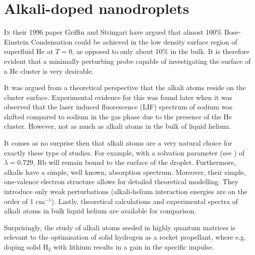 \chapter{Alkali-doped nanodroplets}

	\lettrine[lines=4]{\color{activeColor}I}{n} their 1996 paper\citep{Griffin1996} Griffin and Stringari have argued that almost 100\% Bose-Einstein Condensation could be achieved in the low density surface region of superfluid He at $T=0$, as opposed to only about 10\% in the bulk. It is therefore evident that a minimally perturbing probe capable of investigating the surface of a He cluster is very desirable.

	It was argued from a theoretical perspective\citep{Dalfovo1994} that the alkali atoms reside on the cluster surface. Experimental evidence for this was found\citep{Stienkemeier1995-1,Stienkemeier1995-2,Ancilotto1995-1} later when it was observed that the laser induced fluorescence (LIF) spectrum of sodium was shifted compared to sodium in the gas phase due to the presence of the He cluster. However, not as much as alkali atoms in the bulk of liquid helium.
	
	It comes as no surprise then that alkali atoms are a very natural choice for exactly these type of studies.  For example, with a solvation parameter (see ) of $\lambda=0.729$\citep{Anc95}, Rb will remain bound to the surface of the droplet. Furthermore, alkalis have a simple, well known, absorption spectrum. Moreover, their simple, one-valence electron structure allows for detailed theoretical modelling. They introduce only weak perturbations (alkali-helium interaction energies are on the order of 1 cm$^{-1}$\citep{Pat91}). Lastly, theoretical calculations\citep{Ancilotto1995-2,Kanorsky1994} and experimental spectra\citep{Tabbert1995,Takahashi1993,Beijersbergen1993} of alkali atoms in bulk liquid helium are available for comparison.

	Surprisingly, the study of alkali atoms seeded in highly quantum matrices is relevant to the optimisation of solid hydrogen as a rocket propellant, where e.g. doping solid H$_2$ with lithium results in a gain in the specific impulse\citep{Carrick1993}.
	
